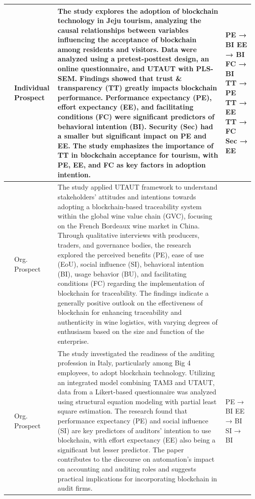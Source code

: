 \documentclass[twocolumn]{article}
\begin{document}
\begin{landscape}
\begin{longtable}{|p{1.7cm}|p{1.5cm}|p{17.7cm}|p{2.0cm}|}
\hline
\textcite{chang_acceptance_2022} & Individual Prospect & The study explores the adoption of blockchain technology in Jeju tourism, analyzing the causal relationships between variables influencing the acceptance of blockchain among residents and visitors. Data were analyzed using a pretest-posttest design, an online questionnaire, and UTAUT with PLS-SEM. Findings showed that trust \& transparency (TT) greatly impacts blockchain performance. Performance expectancy (PE), effort expectancy (EE), and facilitating conditions (FC) were significant predictors of behavioral intention (BI). Security (Sec) had a smaller but significant impact on PE and EE. The study emphasizes the importance of TT in blockchain acceptance for tourism, with PE, EE, and FC as key factors in adoption intention. & PE → BI \newline EE → BI \newline FC → BI \newline TT → PE \newline TT → EE \newline TT → FC \newline Sec → EE \\
\hline
\textcite{cordeiro_blockchain-based_2021} & Org. Prospect & The study applied UTAUT framework to understand stakeholders' attitudes and intentions towards adopting a blockchain-based traceability system within the global wine value chain (GVC), focusing on the French Bordeaux wine market in China. Through qualitative interviews with producers, traders, and governance bodies, the research explored the perceived benefits (PE), ease of use (EoU), social influence (SI), behavioral intention (BI), usage behavior (BU), and facilitating conditions (FC) regarding the implementation of blockchain for traceability. The findings indicate a generally positive outlook on the effectiveness of blockchain for enhancing traceability and authenticity in wine logistics, with varying degrees of enthusiasm based on the size and function of the enterprise.  & \\
\hline
\textcite{ferri_ascertaining_2021} & Org. Prospect & The study investigated the readiness of the auditing profession in Italy, particularly among Big 4 employees, to adopt blockchain technology. Utilizing an integrated model combining TAM3 and UTAUT, data from a Likert-based questionnaire was analyzed using structural equation modeling with partial least square estimation. The research found that performance expectancy (PE) and social influence (SI) are key predictors of auditors' intention to use blockchain, with effort expectancy (EE) also being a significant but lesser predictor. The paper contributes to the discourse on automation's impact on accounting and auditing roles and suggests practical implications for incorporating blockchain in audit firms.  & PE → BI \newline EE → BI \newline SI → BI \\

\end{longtable}
\end{landscape}
\end{document}
